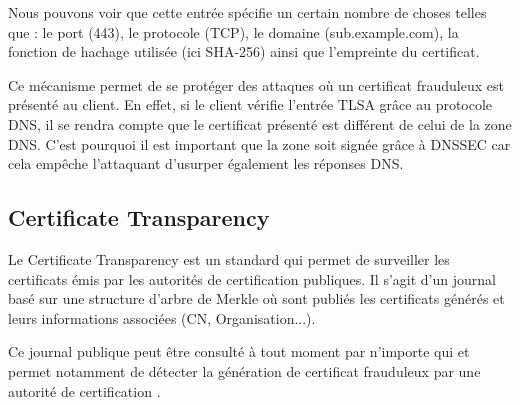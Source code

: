 Nous pouvons voir que cette entrée spécifie un certain nombre de choses telles que : le port (443), le protocole (TCP), le domaine (sub.example.com), la fonction de hachage utilisée (ici SHA-256) ainsi que l'empreinte du certificat.

Ce mécanisme permet de se protéger des attaques où un certificat frauduleux est présenté au client. En effet, si le client vérifie l'entrée TLSA grâce au protocole DNS, il se rendra compte que le certificat présenté est différent de celui de la zone DNS. C'est pourquoi il est important que la zone soit signée grâce à DNSSEC car cela empêche l'attaquant d'usurper également les réponses DNS.

\subsection{Certificate Transparency}

Le Certificate Transparency est un standard qui permet de surveiller les certificats émis par les autorités de certification publiques. Il s'agit d'un journal basé sur une structure d'arbre de Merkle où sont publiés les certificats générés et leurs informations associées (CN, Organisation...).

Ce journal publique peut être consulté à tout moment par n'importe qui et permet notamment de détecter la génération de certificat frauduleux par une autorité de certification \cite{certificate-transparency}.
